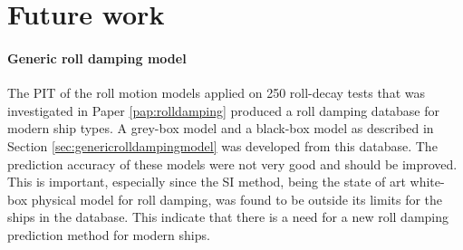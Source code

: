\chapter{Future work\label{ch:future_work}}

\subsubsection*{Generic roll damping model}
The PIT of the roll motion models applied on 250 roll-decay tests that was investigated in Paper \ref{pap:rolldamping} produced a roll damping database for modern ship types. A grey-box model and a black-box model as described in Section \ref{sec:genericrolldampingmodel} was developed from this database. The prediction accuracy of these models were not very good and should be improved. This is important, especially since the SI method, being the state of art white-box physical model for roll damping, was found to be outside its limits for the ships in the database. This indicate that there is a need for a new roll damping prediction method for modern ships.  
